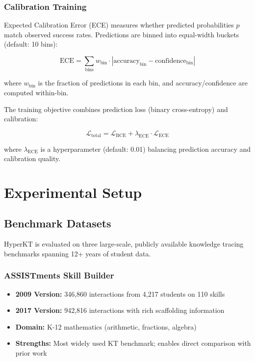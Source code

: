 \documentclass[10pt,twocolumn]{article}
\begin{document}
\subsubsection{Calibration Training}
Expected Calibration Error (ECE) measures whether predicted probabilities $\hat{p}$ match observed success rates. Predictions are binned into equal-width buckets (default: 10 bins):

\begin{equation}
\text{ECE} = \sum_{\text{bins}} w_{\text{bin}} \cdot |\text{accuracy}_{\text{bin}} - \text{confidence}_{\text{bin}}|
\end{equation}

where $w_{\text{bin}}$ is the fraction of predictions in each bin, and accuracy/confidence are computed within-bin.

The training objective combines prediction loss (binary cross-entropy) and calibration:

\begin{equation}
\mathcal{L}_{\text{total}} = \mathcal{L}_{\text{BCE}} + \lambda_{\text{ECE}} \cdot \mathcal{L}_{\text{ECE}}
\end{equation}

where $\lambda_{\text{ECE}}$ is a hyperparameter (default: 0.01) balancing prediction accuracy and calibration quality.

\section{Experimental Setup}

\subsection{Benchmark Datasets}

HyperKT is evaluated on three large-scale, publicly available knowledge tracing benchmarks spanning 12+ years of student data.

\subsubsection{ASSISTments Skill Builder}
\begin{itemize}
  \item \textbf{2009 Version:} 346,860 interactions from 4,217 students on 110 skills
  \item \textbf{2017 Version:} 942,816 interactions with rich scaffolding information
  \item \textbf{Domain:} K-12 mathematics (arithmetic, fractions, algebra)
  \item \textbf{Strengths:} Most widely used KT benchmark; enables direct comparison with prior work
\end{itemize}
\end{document}
